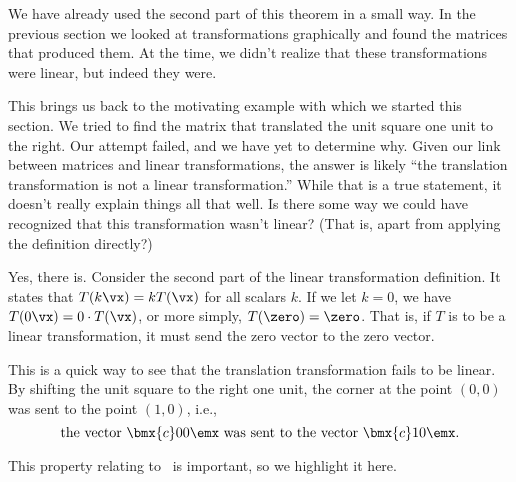 We have already used the second part of this theorem in a small way. In the previous section we looked at transformations graphically and found the matrices that produced them. At the time, we didn't realize that these transformations were linear, but indeed they were.

This brings us back to the motivating example with which we started this section. We tried to find the matrix that translated the unit square one unit to the right. Our attempt failed, and we have yet to determine why. Given our link between matrices and linear transformations, the answer is likely ``the translation transformation is not a linear transformation.'' While that is a true statement, it doesn't really explain things all that well. Is there some way we could have recognized that this transformation wasn't linear? (That is, apart from applying the definition directly?)

Yes, there is. Consider the second part of the linear transformation definition. It states that $T(k\vx) = kT(\vx)$ for all scalars $k$. If we let $k=0$, we have $T(0\vx) = 0\cdot T(\vx)$, or more simply, $T(\zero) = \zero$. That is, if $T$ is to be a linear transformation, it must send the zero vector  to the zero vector.

This is a quick way to see that the translation transformation fails to be linear. By shifting the unit square to the right one unit, the corner at the point $(0,0)$ was sent to the point $(1,0)$, i.e., 
\[
\text{the vector } \bmx{c}0\\0\emx \text{ was sent to the vector } \bmx{c}1\\0\emx.
\]

This property relating to \zero\ is important, so we highlight it here.

\smallskip


\smallskip




